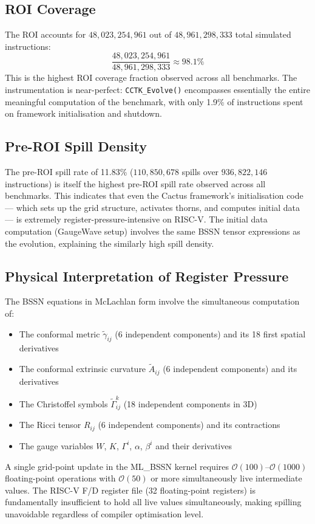 \documentclass[conference]{IEEEtran}
\begin{document}
\subsection{ROI Coverage}

The ROI accounts for $48{,}023{,}254{,}961$ out of
$48{,}961{,}298{,}333$ total simulated instructions:
\[
\frac{48{,}023{,}254{,}961}{48{,}961{,}298{,}333} \approx 98.1\%
\]
This is the highest ROI coverage fraction observed across all
benchmarks. The instrumentation is near-perfect: \texttt{CCTK\_Evolve()}
encompasses essentially the entire meaningful computation of the
benchmark, with only 1.9\% of instructions spent on framework
initialisation and shutdown.

\subsection{Pre-ROI Spill Density}

The pre-ROI spill rate of 11.83\% ($110{,}850{,}678$ spills over
$936{,}822{,}146$ instructions) is itself the highest pre-ROI spill
rate observed across all benchmarks. This indicates that even the
Cactus framework's initialisation code --- which sets up the grid
structure, activates thorns, and computes initial data --- is
extremely register-pressure-intensive on RISC-V. The initial data
computation (GaugeWave setup) involves the same BSSN tensor
expressions as the evolution, explaining the similarly high spill density.

\subsection{Physical Interpretation of Register Pressure}

The BSSN equations in McLachlan form involve the simultaneous
computation of:
\begin{itemize}
    \item The conformal metric $\tilde{\gamma}_{ij}$ (6 independent
          components) and its 18 first spatial derivatives
    \item The conformal extrinsic curvature $\tilde{A}_{ij}$
          (6 independent components) and its derivatives
    \item The Christoffel symbols $\tilde{\Gamma}^k_{ij}$
          (18 independent components in 3D)
    \item The Ricci tensor $R_{ij}$ (6 independent components)
          and its contractions
    \item The gauge variables $W$, $K$, $\Gamma^i$, $\alpha$,
          $\beta^i$ and their derivatives
\end{itemize}
A single grid-point update in the ML\_BSSN kernel requires
$\mathcal{O}(100)$--$\mathcal{O}(1000)$ floating-point operations
with $\mathcal{O}(50)$ or more simultaneously live intermediate
values. The RISC-V F/D register file (32 floating-point registers)
is fundamentally insufficient to hold all live values simultaneously,
making spilling unavoidable regardless of compiler optimisation level.
\end{document}
